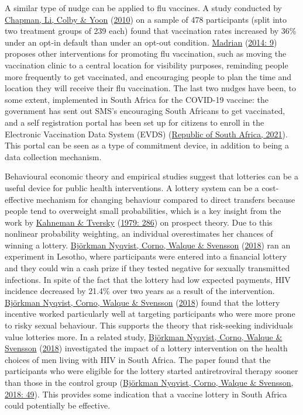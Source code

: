 \documentclass[11pt,preprint, authoryear]{elsarticle}
\numberwithin{equation}{section}
\numberwithin{figure}{section}
\numberwithin{table}{section}
\begin{document}
A similar type of nudge can be applied to flu vaccines. A study
conducted by \protect\hyperlink{ref-opt}{Chapman, Li, Colby \& Yoon}
(\protect\hyperlink{ref-opt}{2010}) on a sample of 478 participants
(split into two treatment groups of 239 each) found that vaccination
rates increased by 36\% under an opt-in default than under an opt-out
condition. \protect\hyperlink{ref-flu}{Madrian}
(\protect\hyperlink{ref-flu}{2014: 9}) proposes other interventions for
promoting flu vaccination, such as moving the vaccination clinic to a
central location for visibility purposes, reminding people more
frequently to get vaccinated, and encouraging people to plan the time
and location they will receive their flu vaccination. The last two
nudges have been, to some extent, implemented in South Africa for the
COVID-19 vaccine: the government has sent out SMS's encouraging South
Africans to get vaccinated, and a self registration portal has been set
up for citizens to enroll in the Electronic Vaccination Data System
(EVDS) (\protect\hyperlink{ref-evds}{Republic of South Africa, 2021}).
This portal can be seen as a type of commitment device, in addition to
being a data collection mechanism.

Behavioural economic theory and empirical studies suggest that lotteries
can be a useful device for public health interventions. A lottery system
can be a cost-effective mechanism for changing behaviour compared to
direct transfers because people tend to overweight small probabilities,
which is a key insight from the work by
\protect\hyperlink{ref-prospect}{Kahneman \& Tversky}
(\protect\hyperlink{ref-prospect}{1979: 286}) on prospect theory. Due to
this nonlinear probability weighting, an individual overestimates her
chances of winning a lottery. \protect\hyperlink{ref-hiv}{Björkman
Nyqvist, Corno, Walque \& Svensson} (\protect\hyperlink{ref-hiv}{2018})
ran an experiment in Lesotho, where participants were entered into a
financial lottery and they could win a cash prize if they tested
negative for sexually transmitted infections. In spite of the fact that
the lottery had low expected payments, HIV incidence decreased by 21.4\%
over two years as a result of the intervention.
\protect\hyperlink{ref-hiv}{Björkman Nyqvist, Corno, Walque \& Svensson}
(\protect\hyperlink{ref-hiv}{2018}) found that the lottery incentive
worked particularly well at targeting participants who were more prone
to risky sexual behaviour. This supports the theory that risk-seeking
individuals value lotteries more. In a related study,
\protect\hyperlink{ref-hiv}{Björkman Nyqvist, Corno, Walque \& Svensson}
(\protect\hyperlink{ref-hiv}{2018}) investigated the impact of a lottery
intervention on the health choices of men living with HIV in South
Africa. The paper found that the participants who were eligible for the
lottery started antiretroviral therapy sooner than those in the control
group (\protect\hyperlink{ref-hiv}{Björkman Nyqvist, Corno, Walque \&
Svensson, 2018: 49}). This provides some indication that a vaccine
lottery in South Africa could potentially be effective.
\end{document}
